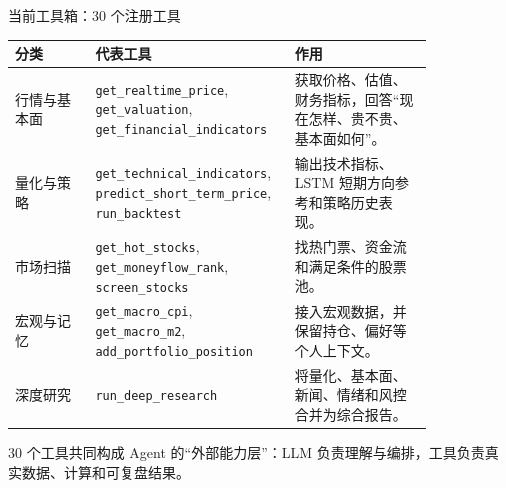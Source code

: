 \documentclass[10pt,aspectratio=43]{beamer}
\newcommand{\code}[1]{\texttt{#1}}
\begin{document}
\begin{frame}{当前工具箱：30 个注册工具}
  \vspace{0.2em}
  \scriptsize
  \renewcommand{\arraystretch}{1.45}
  \centering
  \begin{tabular}{p{0.18\linewidth}p{0.34\linewidth}p{0.31\linewidth}}
    \toprule
    分类 & 代表工具 & 作用 \\
    \midrule
    行情与基本面 &
    \code{get\_realtime\_price}, \code{get\_valuation}, \code{get\_financial\_indicators} &
    获取价格、估值、财务指标，回答“现在怎样、贵不贵、基本面如何”。 \\
    量化与策略 &
    \code{get\_technical\_indicators}, \code{predict\_short\_term\_price}, \code{run\_backtest} &
    输出技术指标、LSTM 短期方向参考和策略历史表现。 \\
    市场扫描 &
    \code{get\_hot\_stocks}, \code{get\_moneyflow\_rank}, \code{screen\_stocks} &
    找热门票、资金流和满足条件的股票池。 \\
    宏观与记忆 &
    \code{get\_macro\_cpi}, \code{get\_macro\_m2}, \code{add\_portfolio\_position} &
    接入宏观数据，并保留持仓、偏好等个人上下文。 \\
    深度研究 &
    \code{run\_deep\_research} &
    将量化、基本面、新闻、情绪和风控合并为综合报告。 \\
    \bottomrule
  \end{tabular}
  \vspace{0.8em}
  \begin{greenbox}
    \footnotesize
    30 个工具共同构成 Agent 的“外部能力层”：LLM 负责理解与编排，工具负责真实数据、计算和可复盘结果。
  \end{greenbox}
\end{frame}
\end{document}

